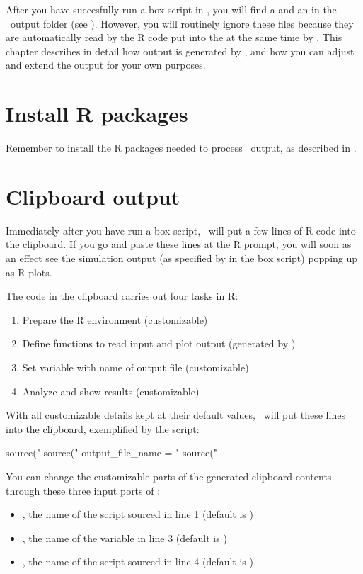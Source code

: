 After you have succesfully run a box script in \US, you will find a  and an  in the \US\ output folder (see ). However, you will routinely ignore these files because they are automatically read by the R code put into the  at the same time by \US. This chapter describes in detail how output is generated by \US, and how you can adjust and extend the output for your own purposes.

\section{Install R packages}
Remember to install the R packages needed to process \US\ output, as described in .

\section{Clipboard output}
Immediately after you have run a box script, \US\ will put a few lines of R code into the clipboard. If you go and paste these lines at the R prompt, you will soon as an effect see the simulation output (as specified by  in the box script) popping up as R plots. 

The code in the clipboard carries out four tasks in R:
\begin{enumerate}
\item Prepare the R environment (customizable)
\item Define functions to read input and plot output (generated by \US)
\item Set variable with name of output file (customizable)
\item Analyze and show results (customizable)
\end{enumerate}
With all customizable details kept at their default values, \US\ will put these lines into the clipboard, exemplified by the  script:
\lstset{numbers=left}
\begin{rscript}
source("%
source("%
output_file_name = "%
source("%
\end{rscript}
\lstset{numbers=none}

You can change the customizable parts of the generated clipboard contents through these three input ports of :
\begin{itemize}
\item {}, the name of the script sourced in line 1 (default is )
\item {}, the name of the variable in line 3 (default is )
\item {}, the name of the script sourced in line 4 (default is )
\end{itemize}

